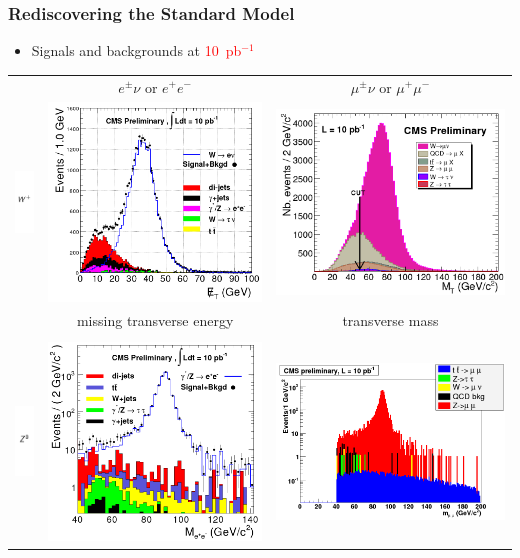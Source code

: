\documentclass[compress]{beamer}
\begin{document}
\begin{frame}
\frametitle{Rediscovering the Standard Model}

\begin{itemize}
\item Signals and backgrounds at \textcolor{red}{10~pb$^{-1}$}
\end{itemize}

\begin{tabular}{c c c}
& $e^\pm\nu$ or $e^+e^-$ & $\mu^\pm\nu$ or $\mu^+\mu^-$ \\
\includegraphics[height=2.7 cm]{wpm.png}\vspace{-0.05 cm} & \includegraphics[height=2.7 cm]{W_ee_10pb-1.png}\vspace{-0.05 cm} & \includegraphics[height=2.7 cm]{W_mumu_10pb-1.png}\vspace{-0.05 cm} \\
& {\scriptsize missing transverse energy} & {\scriptsize transverse mass} \\
& & \\
\includegraphics[height=2.7 cm]{z0.png}\vspace{-0.05 cm}  & \includegraphics[height=2.7 cm]{Z_ee_10pb-1.png}\vspace{-0.05 cm} & \includegraphics[height=2.7 cm]{Z_mumu_10pb-1.png}\vspace{-0.05 cm} \\

\end{tabular}
\end{frame}
\end{document}
